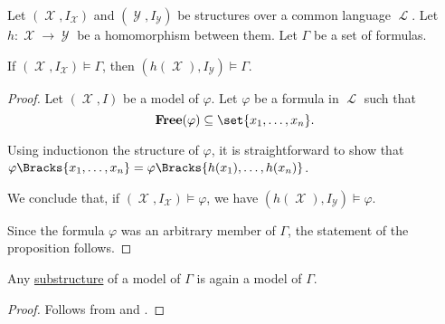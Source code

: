 \begin{proposition}\label{thm:first_order_homomorphism_preserves_models}
  Let \( (\mscrX, I_{\mscrX}) \) and \( (\mscrY, I_{\mscrY}) \) be structures over a common language \( \mscrL \). Let \( h: \mscrX \to \mscrY \) be a homomorphism between them. Let \( \Gamma \) be a set of formulas.

  If \( (\mscrX, I_{\mscrX}) \models \Gamma \), then \( (h(\mscrX), I_{\mscrY}) \models \Gamma \).
\end{proposition}
\begin{proof}
  Let \( (\mscrX, I) \) be a model of \( \varphi \). Let \( \varphi \) be a formula in \( \mscrL \) such that
  \begin{equation*}
    \boldop{Free}(\varphi) \subseteq \set{x_1, \ldots, x_n}.
  \end{equation*}

  Using induction\IND on the structure of \( \varphi \), it is straightforward to show that \( \varphi\Bracks{x_1, \ldots, x_n} = \varphi\Bracks{h(x_1), \ldots, h(x_n)} \).

  We conclude that, if \( (\mscrX, I_{\mscrX}) \models \varphi \), we have \( (h(\mscrX), I_{\mscrY}) \models \varphi \).

  Since the formula \( \varphi \) was an arbitrary member of \( \Gamma \), the statement of the proposition follows.
\end{proof}

\begin{corollary}\label{thm:substructure_is_model}
  Any \hyperref[def:first_order_substructure]{substructure} of a model of \( \Gamma \) is again a model of \( \Gamma \).
\end{corollary}
\begin{proof}
  Follows from  and .
\end{proof}

\begin{remark}\label{rem:induction}
\end{remark}

\begin{definition}\label{def:first_order_model_category}
\end{definition}
